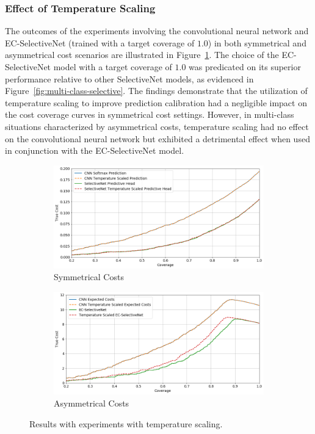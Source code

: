 \subsubsection{Effect of Temperature Scaling}
The outcomes of the experiments involving the convolutional neural network and EC-SelectiveNet (trained with a target coverage of $1.0$) in both symmetrical and asymmetrical cost scenarios are illustrated in Figure~\ref{fig:multi-class-temp}. The choice of the EC-SelectiveNet model with a target coverage of $1.0$ was predicated on its superior performance relative to other SelectiveNet models, as evidenced in Figure~\ref{fig:multi-class-selective}. The findings demonstrate that the utilization of temperature scaling to improve prediction calibration had a negligible impact on the cost coverage curves in symmetrical cost settings. However, in multi-class situations characterized by asymmetrical costs, temperature scaling had no effect on the convolutional neural network but exhibited a detrimental effect when used in conjunction with the EC-SelectiveNet model.

\begin{figure}[!h]
	\centering
	\begin{subfigure}{\textwidth}
		\centering
		\includegraphics[width=\linewidth]{images/multi-class-temp-sym.png}
		\caption{Symmetrical Costs}	
	\end{subfigure}
	\begin{subfigure}{\textwidth}
		\centering
		\includegraphics[width=\linewidth]{images/multi-class-temp-asym.png}
		\caption{Asymmetrical Costs}
	\end{subfigure}
	\caption{Results with experiments with temperature scaling.}
	\label{fig:multi-class-temp}
\end{figure}

